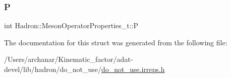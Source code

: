 \subsubsection{\texorpdfstring{P}{P}}
{\footnotesize\ttfamily int Hadron\+::\+Meson\+Operator\+Properties\+\_\+t\+::P}



The documentation for this struct was generated from the following file\+:\begin{DoxyCompactItemize}
\item 
/\+Users/archanar/\+Kinematic\+\_\+factor/adat-\/devel/lib/hadron/do\+\_\+not\+\_\+use/\mbox{\hyperlink{adat-devel_2lib_2hadron_2do__not__use_2do__not__use_8irreps_8h}{do\+\_\+not\+\_\+use.\+irreps.\+h}}\end{DoxyCompactItemize}
